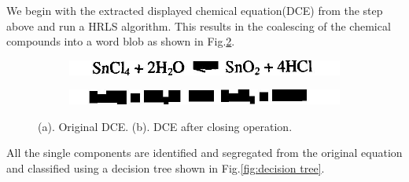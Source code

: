 \documentclass[conference]{IEEEtran}
\begin{document}
We begin with the extracted displayed chemical equation(DCE) from the step above and run a HRLS algorithm. %
%
This results in the coalescing of the chemical compounds into a word blob as shown in Fig.\ref{fig:blob_equ}. 

\begin{figure}[h!]

\begin{subfigure}{0.5\textwidth}
\centering 
\includegraphics[width=0.9\linewidth]{original_equ} 
\caption{}
\label{fig:org_equ}
\end{subfigure}

\begin{subfigure}{0.5\textwidth}
\centering 
\includegraphics[width=0.92\linewidth]{blob_equ}
\caption{}
\label{fig:blob_equ}
\end{subfigure}
 
\caption{(a). Original DCE. (b). DCE after closing operation.}
\label{fig:image2}

\end{figure}

%

All the single components are identified and segregated from the original equation and classified using a decision tree shown in Fig.\ref{fig:decision tree}.
\end{document}
